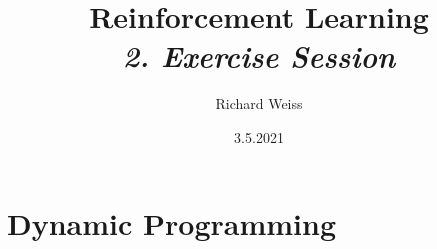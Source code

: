 \documentclass{article}
\title
{
    Reinforcement Learning \\
    \vspace{4pt}
    \normalsize
    \textit{2. Exercise Session}
}
\author{Richard Weiss}
\date{3.5.2021}
\numberwithin{figure}{section}
\begin{document}
\maketitle

\setcounter{section}{2}
\section{Dynamic Programming}









\printbibliography
\end{document}
